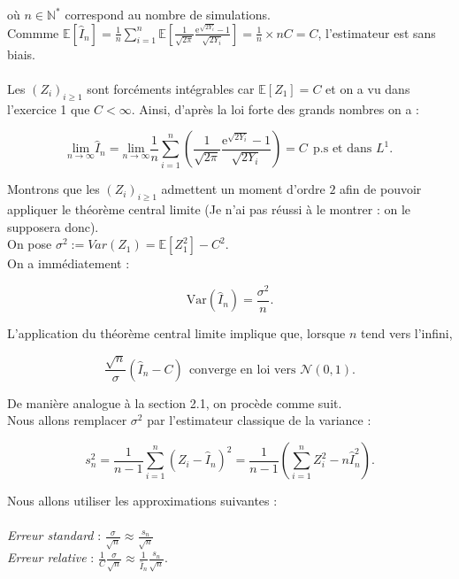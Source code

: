 \documentclass{article}
\theoremstyle{exostyle}
\newenvironment{questions}{
\begin{enumerate}[\hspace{12pt} 1.]}{\end{enumerate}}
\begin{document}
\begin{questions}
où $n \in \mathbb{N}^{*}$ correspond au nombre de simulations.\\

Commme $\mathbb{E} [\hat{I}_{n}] = \frac{1}{n} \sum_{i=1}^{n} \mathbb{E} \left[ \frac{1}{\sqrt{2\pi}} \frac{\text{e}^{\sqrt{2Y_{i}}}-1}{\sqrt{2Y_{i}}}\right] = \frac{1}{n} \times nC = C$, l'estimateur est sans biais.\\
\\

Les $(Z_{i})_{i \geq 1}$ sont forcéments intégrables car $\mathbb{E}[Z_{1}] = C$ et on a vu dans l'exercice 1 que $C < \infty$. Ainsi, d'après la loi forte des grands nombres on a :

\[\underset{n \to \infty}{\text{lim}} \hat{I}_{n} = \underset{n \to \infty}{\text{lim}} \frac{1}{n} \sum_{i=1}^{n} \left(\frac{1}{\sqrt{2\pi}} \frac{\text{e}^{\sqrt{2Y_{i}}}-1}{\sqrt{2Y_{i}}} \right) = C \ \ \text{p.s et dans $L^{1}$}.\]

Montrons que les $(Z_{i})_{i \geq 1}$ admettent un moment d'ordre $2$ afin de pouvoir appliquer le théorème central limite (Je n'ai pas réussi à le montrer : on le supposera donc).\\

On pose $\sigma^{2} := Var(Z_{1}) = \mathbb{E}\left[ Z_{1}^{2} \right] - C^{2}$.\\
On a immédiatement :

\[\text{Var}(\hat{I}_{n}) = \frac{\sigma^{2}}{n}.\]

L'application du théorème central limite implique que, lorsque $n$ tend vers l'infini, 

\[\frac{\sqrt{n}}{\sigma}(\hat{I}_{n} - C) \ \ \text{converge en loi vers $\mathcal{N}(0,1)$.}\]

De manière analogue à la section 2.1, on procède comme suit.\\
Nous allons remplacer $\sigma^{2}$ par l'estimateur classique de la variance : 

\[s_{n}^{2} = \frac{1}{n-1} \sum_{i=1}^{n} \left( Z_{i} - \hat{I}_{n} \right)^{2} = \frac{1}{n-1} \left( \sum_{i=1}^{n} Z_{i}^{2} - n\hat{I}_{n}^{2} \right).\]

Nous allons utiliser les approximations suivantes :\\

\\
\textit{Erreur standard} : $\frac{\sigma}{\sqrt{n}} \approx \frac{s_{n}}{\sqrt{n}}$\\
\textit{Erreur relative} : $\frac{1}{C}\frac{\sigma}{\sqrt{n}} \approx \frac{1}{\hat{I}_{n}}\frac{s_{n}}{\sqrt{n}}$.


\end{questions}
\end{document}
